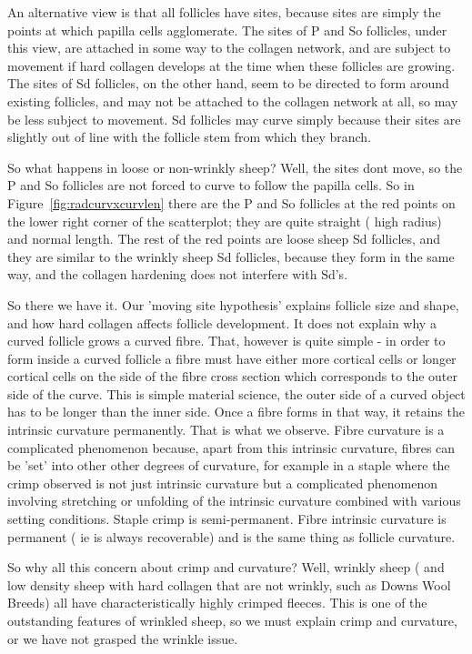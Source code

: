 \documentclass[titlepage]{article}  %
\begin{document}
An alternative view is that all follicles have sites, because sites are simply the points at which papilla cells agglomerate. The sites of P and So follicles, under this view, are attached in some way to the collagen network, and are subject to movement if hard collagen develops at the time when these follicles are growing. The sites of Sd follicles, on the other hand, seem to be directed to form around existing follicles, and may not be attached to the collagen network at all, so may be less subject to movement. Sd follicles may curve simply because their sites are  slightly out of line with the follicle stem from which they branch.

So what happens in loose or non-wrinkly sheep? Well, the sites dont move, so the P and So follicles are not forced to curve to follow the papilla cells. So in Figure~\ref{fig:radcurvxcurvlen} there are the P and So follicles at the red points on the lower right corner of the scatterplot; they are quite straight ( high radius) and normal length. The rest of the red points are loose sheep Sd follicles, and they are similar to the wrinkly sheep Sd follicles, because they form in the same way, and the collagen hardening does not interfere with Sd's.

So there we have it. Our 'moving site hypothesis' explains  follicle size and shape, and how hard collagen affects follicle development. It does not explain why a curved follicle grows a curved fibre. That, however is quite simple - in order to form inside a curved follicle a fibre must have either more cortical cells or longer cortical cells on the side of the fibre cross section which corresponds to the outer side of the curve. This is simple material science, the outer side of a curved object has to be longer than the inner side. Once a fibre forms in  that way, it retains the intrinsic curvature permanently. That is what we observe. Fibre curvature is a complicated phenomenon because, apart from this intrinsic curvature, fibres can be 'set' into other other degrees of curvature, for example in a staple where the crimp observed is not just intrinsic curvature but a complicated phenomenon involving stretching or unfolding of the intrinsic curvature combined with various setting conditions. Staple crimp is semi-permanent. Fibre intrinsic curvature is permanent ( ie is always recoverable) and is the same thing as follicle curvature.

So why all this concern about crimp and curvature? Well, wrinkly sheep ( and  low density sheep with hard collagen that are not wrinkly, such as Downs Wool Breeds)  all have characteristically highly crimped fleeces. This is one of the outstanding features of wrinkled sheep, so we must explain crimp and curvature, or we have not grasped the wrinkle issue.
\end{document}
